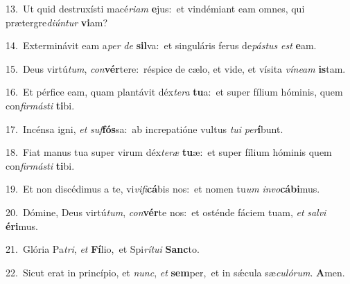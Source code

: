 {\numbfont\textcolor{\numbcolor}{13.}}~Ut quid destruxísti macé\-\textit{ri}\-\textit{am} \textbf{e}\-jus:~\star et vindémiant eam omnes, qui prætergre\-\textit{di}\-\textit{ún}\textit{tur} \textbf{vi}\-am?\par
{\numbfont\textcolor{\numbcolor}{14.}}~Exterminávit eam a\textit{per} \textit{de} \textbf{sil}\-va:~\star et singuláris ferus de\-\textit{pás}\-\textit{tus} \textit{est} \textbf{e}\-am.\par
{\numbfont\textcolor{\numbcolor}{15.}}~Deus virtú\-\textit{tum}\-, \textit{con}\-\textbf{vér}tere:~\star réspice de cælo, et vide, et vísita \textit{ví}\-\textit{ne}\textit{am} \textbf{is}\-tam.\par
{\numbfont\textcolor{\numbcolor}{16.}}~Et pérfice eam, quam plantávit déx\-\textit{te}\-\textit{ra} \textbf{tu}\-a:~\star et super fílium hóminis, quem con\-\textit{fir}\-\textit{más}\textit{ti} \textbf{ti}\-bi.\par
{\numbfont\textcolor{\numbcolor}{17.}}~Incénsa igni, \textit{et} \textit{suf}\-\textbf{fós}sa:~\star ab increpatióne vultus \textit{tu}\-\textit{i} \textit{per}\-\textbf{í}bunt.\par
{\numbfont\textcolor{\numbcolor}{18.}}~Fiat manus tua super virum déx\-\textit{te}\-\textit{ræ} \textbf{tu}\-æ:~\star et super fílium hóminis quem con\-\textit{fir}\-\textit{más}\textit{ti} \textbf{ti}\-bi.\par
{\numbfont\textcolor{\numbcolor}{19.}}~Et non discédimus a te, vi\-\textit{vi}\-\textit{fi}\textbf{cá}bis nos:~\star et nomen tu\textit{um} \textit{in}\-\textit{vo}\textbf{cá}\textbf{bi}mus.\par
{\numbfont\textcolor{\numbcolor}{20.}}~Dómine, Deus virtú\-\textit{tum}\-, \textit{con}\-\textbf{vér}te nos:~\star et osténde fáciem tuam, \textit{et} \textit{sal}\-\textit{vi} \textbf{é}\-\textbf{ri}mus.\par
{\numbfont\textcolor{\numbcolor}{21.}}~Glória Pa\-\textit{tri}\-, \textit{et} \textbf{Fí}\-lio,~\star et Spi\-\textit{rí}\-\textit{tu}\textit{i} \textbf{Sanc}\-to.\par
{\numbfont\textcolor{\numbcolor}{22.}}~Sicut erat in princípio, et \textit{nunc}\-, \textit{et} \textbf{sem}\-per,~\star et in sǽcula sæ\-\textit{cu}\-\textit{ló}\textit{rum}. \textbf{A}\-men.\par

